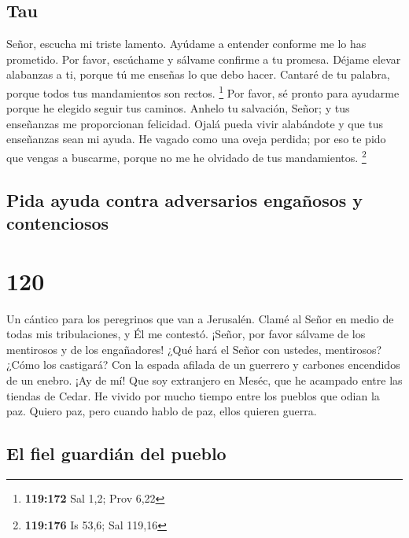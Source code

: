 \hypertarget{tau}{%
\subsection{Tau}\label{tau}}

 Señor, escucha mi triste lamento. Ayúdame a entender
conforme me lo has prometido.  Por favor, escúchame y
sálvame confirme a tu promesa.  Déjame elevar alabanzas a
ti, porque tú me enseñas lo que debo hacer.  Cantaré de tu
palabra, porque todos tus mandamientos son rectos. \footnote{\textbf{119:172}
  Sal 1,2; Prov 6,22}  Por favor, sé pronto para ayudarme
porque he elegido seguir tus caminos.  Anhelo tu
salvación, Señor; y tus enseñanzas me proporcionan felicidad.
 Ojalá pueda vivir alabándote y que tus enseñanzas sean mi
ayuda.  He vagado como una oveja perdida; por eso te pido
que vengas a buscarme, porque no me he olvidado de tus mandamientos.
\footnote{\textbf{119:176} Is 53,6; Sal 119,16}

\hypertarget{pida-ayuda-contra-adversarios-engauxf1osos-y-contenciosos}{%
\subsection{Pida ayuda contra adversarios engañosos y
contenciosos}\label{pida-ayuda-contra-adversarios-engauxf1osos-y-contenciosos}}

\hypertarget{section-119}{%
\section{120}\label{section-119}}

Un cántico para los peregrinos que van a Jerusalén.  Clamé
al Señor en medio de todas mis tribulaciones, y Él me contestó.
 ¡Señor, por favor sálvame de los mentirosos y de los
engañadores!  ¿Qué hará el Señor con ustedes, mentirosos?
¿Cómo los castigará?  Con la espada afilada de un guerrero y
carbones encendidos de un enebro.  ¡Ay de mí! Que soy
extranjero en Meséc, que he acampado entre las tiendas de Cedar.
 He vivido por mucho tiempo entre los pueblos que odian la
paz.  Quiero paz, pero cuando hablo de paz, ellos quieren
guerra.

\hypertarget{el-fiel-guardiuxe1n-del-pueblo}{%
\subsection{El fiel guardián del
pueblo}\label{el-fiel-guardiuxe1n-del-pueblo}}


